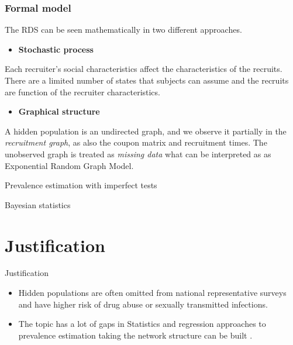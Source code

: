 \documentclass{beamer}
\newcommand{\Space}{\vspace{3ex}}
\begin{document}
\begin{frame}
  
  \frametitle{Formal model}

  The RDS can be seen mathematically in two different approaches. 

  \Space

  \begin{itemize}
    \item {\bf Stochastic process} \cite{heckathorn1997}
  \end{itemize}

  Each recruiter's social characteristics affect the characteristics of the
  recruits. There are a limited number of states that subjects can assume and
  the recruits are function of the recruiter characteristics.

  \Space

  \begin{itemize}
    \item {\bf Graphical structure} \cite{crawford2016}
  \end{itemize}

  A hidden population is an undirected graph, and we observe it partially in
  the {\em recruitment graph}, as also the coupon matrix and recruitment
  times. The unobserved graph is treated as {\em missing data} what can be
  interpreted as as Exponential Random Graph Model.  

\end{frame}

\begin{frame}{Prevalence estimation with imperfect tests}

\end{frame}

\begin{frame}{Bayesian statistics}

\end{frame}


\section{Justification}

\begin{frame}{Justification}

  \begin{itemize}
    \item Hidden populations are often omitted from national representative
    surveys and have higher risk of drug abuse or sexually transmitted
    infections. 

    \pause

    \Space
    
    \item The topic has a lot of gaps in Statistics and regression approaches
    to prevalence estimation taking the network structure can be built \cite{bastos2012binary}.
  \end{itemize}
\end{frame}
\end{document}
